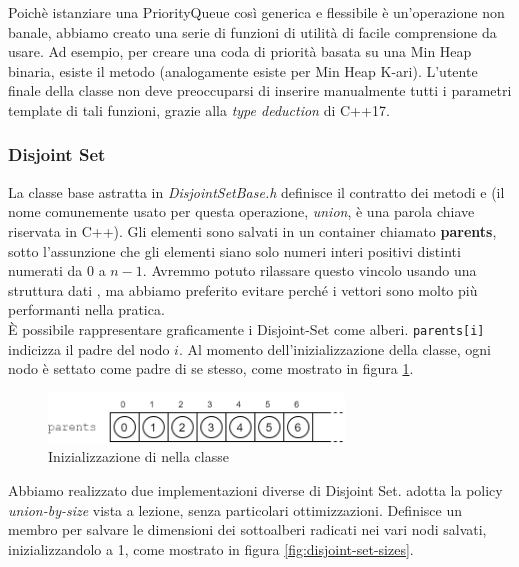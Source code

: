 \noindent Poichè istanziare una PriorityQueue così generica e flessibile è un'operazione non banale, abbiamo creato una serie di funzioni di utilità di facile comprensione da usare. Ad esempio, per creare una coda di priorità basata su una Min Heap binaria, esiste il metodo  (analogamente esiste  per Min Heap K-ari).
L'utente finale della classe non deve preoccuparsi di inserire manualmente tutti i parametri template di tali funzioni, grazie alla \textit{type deduction} di C++17.

\subsubsection{Disjoint Set}

La classe base astratta in \textit{DisjointSetBase.h} definisce il contratto dei metodi  e  (il nome comunemente usato per questa operazione, \textit{union}, è una parola chiave riservata in C++).
Gli elementi sono salvati in un container  chiamato \textbf{parents}, sotto l'assunzione che gli elementi siano solo numeri interi positivi distinti numerati da $0$ a $n-1$.
Avremmo potuto rilassare questo vincolo usando una struttura dati , ma abbiamo preferito evitare perché i vettori sono molto più performanti nella pratica. \\

\noindent È possibile rappresentare graficamente i Disjoint-Set come alberi.
\texttt{parents[i]} indicizza il padre del nodo $i$. Al momento dell'inizializzazione della classe, ogni nodo è settato come padre di se stesso, come mostrato in figura \ref{fig:disjoint-set-base-parents}.

\begin{figure}[htbp]
	\centering
	\includegraphics[width=0.7\textwidth]{./images/DisjointSetParentsVector.png}
	\caption{Inizializzazione di  nella classe }
	\label{fig:disjoint-set-base-parents}
\end{figure}

\noindent Abbiamo realizzato due implementazioni diverse di Disjoint Set.
 adotta la policy \textit{union-by-size} vista a lezione, senza particolari ottimizzazioni. Definisce un membro  per salvare le dimensioni dei sottoalberi radicati nei vari nodi salvati, inizializzandolo a 1, come mostrato in figura \ref{fig:disjoint-set-sizes}.

